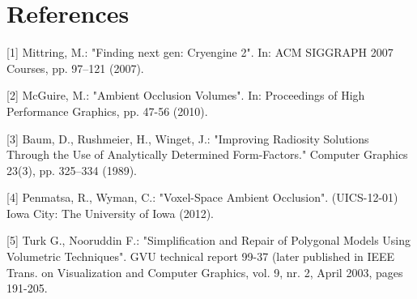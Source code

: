 \documentclass{amsart}
\begin{document}

\indent{\textcolor{red}{Afton, do you think I should be specific about threads, blocks, etc. considerations for GPU side of things?}}

\vspace{2mm}

\section*{References}

[1] Mittring, M.: "Finding next gen: Cryengine 2". In: ACM SIGGRAPH 2007 Courses, pp. 97--121 (2007).


[2] McGuire, M.: "Ambient Occlusion Volumes". In: Proceedings of High Performance Graphics, pp. 47-56 (2010).


[3] Baum, D., Rushmeier, H., Winget, J.: "Improving Radiosity Solutions Through the Use of Analytically Determined Form-Factors." Computer Graphics 23(3), pp. 325--334 (1989).


[4] Penmatsa, R., Wyman, C.: "Voxel-Space Ambient Occlusion". (UICS-12-01) Iowa City: The University of Iowa (2012).


[5] Turk G., Nooruddin F.: "Simplification and Repair of Polygonal Models Using Volumetric Techniques". GVU technical report 99-37 (later published in IEEE Trans. on Visualization and Computer Graphics, vol. 9, nr. 2, April 2003, pages 191-205.
\end{document}
